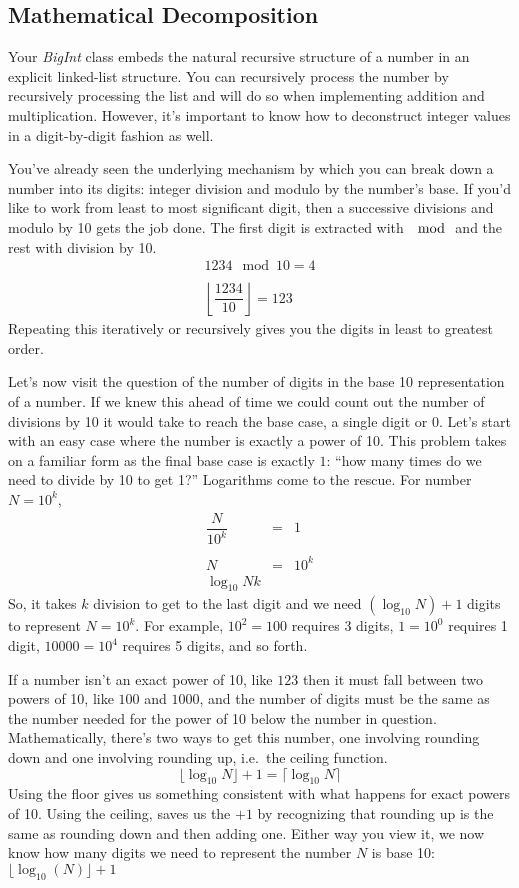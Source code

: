 \documentclass[10pt]{article}
\begin{document}
\subsection*{Mathematical Decomposition}

Your \textit{BigInt} class embeds the natural recursive structure of a number in an explicit linked-list structure. You can recursively process the number by recursively processing the list and will do so when implementing addition and multiplication. However, it's important to know how to deconstruct integer values in a digit-by-digit fashion as well.

You've already seen the underlying mechanism by which you can break down a number into its digits: integer division and modulo by the number's base. If you'd like to work from least to most significant digit, then a successive divisions and modulo by 10 gets the job done. The first digit is extracted with $\mod$ and the rest with division by 10.
\[
\begin{array}{l}
1234 \mod 10 = 4 \\ \\
\left\lfloor \dfrac{1234}{10} \right\rfloor = 123
\end{array}
\]
Repeating this iteratively or recursively gives you the digits in least to greatest order.

Let's now visit the question of the number of digits in the base 10 representation of a number. If we knew this ahead of time we could count out the number of divisions by 10 it would take to reach the base case, a single digit or 0. Let's start with an easy case where the number is exactly a power of 10. This problem takes on a familiar form as the final base case is exactly $1$:  ``how many times do we need to divide by 10 to get 1?'' Logarithms come to the rescue. For number $N = 10^k$,
\[
\begin{array}{rcl}
\dfrac{N}{10^k} &=& 1 \\ \\
N &=& 10^k \\
\log_{10} N k
\end{array}
\]
So, it takes $k$ division to get to the last digit and we need $(\log_{10} N) + 1$ digits to represent $N = 10^k$.  For example, $10^2 = 100$ requires 3 digits, $1 = 10^0$ requires 1 digit, $10000 = 10^4$ requires 5 digits, and so forth.

If a number isn't an exact power of 10, like $123$ then it must fall between two powers of 10, like $100$ and $1000$, and the number of digits must be the same as the number needed for the power of 10 below the number in question. Mathematically, there's two ways to get this number, one involving rounding down and one involving rounding up, i.e.\ the ceiling function.
\[
\lfloor \log_{10} N \rfloor + 1  = \lceil \log_{10} N \rceil
\]
Using the floor gives us something consistent with what happens for exact powers of 10. Using the ceiling, saves us the $+1$ by recognizing that rounding up is the same as rounding down and then adding one. Either way you view it, we now know how many digits we need to represent the number $N$ is base 10: $\lfloor\log_{10}(N)\rfloor + 1$
\end{document}
